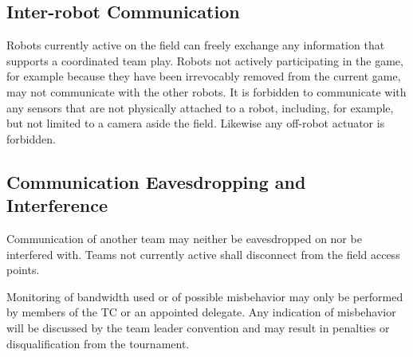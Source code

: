 \documentclass[12pt,twoside]{article}
\newenvironment{rulechange}{}{}
\begin{document}
\subsection{Inter-robot Communication}
\label{sec:inter-robot-comm}
Robots currently active on the field can freely exchange any
information that supports a coordinated team play. Robots not actively
participating in the game, for example because they have been
irrevocably removed from the current game, may not communicate with
the other robots. It is forbidden to communicate with any sensors that
are not physically attached to a robot, including, for example, but
not limited to a camera aside the field. Likewise any off-robot
actuator is forbidden.

\subsection{Communication Eavesdropping and Interference}
\label{sec:comm-tampering}
Communication of another team may neither be eavesdropped on nor be
interfered with. Teams not currently active shall disconnect from the
field access points.

Monitoring of bandwidth used or of possible misbehavior may only be
performed by members of the \ac{TC} or an appointed delegate.
Any indication of misbehavior will be discussed by the team leader
convention and may result in penalties or disqualification from the
tournament.


\end{document}

